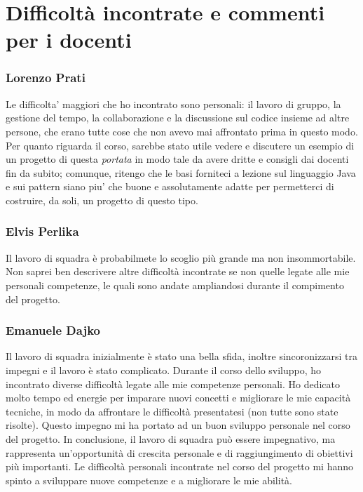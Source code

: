 \documentclass[a4paper,12pt]{report}
\begin{document}
\section{Difficoltà incontrate e commenti per i docenti}

\subsubsection{Lorenzo Prati}
Le difficolta' maggiori che ho incontrato sono personali: il lavoro di gruppo, la gestione del tempo, la collaborazione e la discussione sul codice insieme ad altre persone, che erano tutte cose che non avevo mai affrontato prima in questo modo. Per quanto riguarda il corso, sarebbe stato utile vedere e discutere un esempio di un progetto di questa \textit{portata} in modo tale da avere dritte e consigli dai docenti fin da subito; comunque, ritengo che le basi forniteci a lezione sul linguaggio Java e sui pattern siano piu' che buone e assolutamente adatte per permetterci di costruire, da soli, un progetto di questo tipo.

\subsubsection{Elvis Perlika}
Il lavoro di squadra è probabilmete lo scoglio più grande ma non insommortabile.
Non saprei ben descrivere altre difficoltà incontrate se non quelle legate 
alle mie personali competenze, le quali sono andate ampliandosi durante il compimento del progetto.

\subsubsection{Emanuele Dajko}
Il lavoro di squadra inizialmente è stato una bella sfida, inoltre sincoronizzarsi tra impegni e il lavoro è stato complicato.
Durante il corso dello sviluppo, ho incontrato diverse difficoltà legate alle mie competenze personali.
Ho dedicato molto tempo ed energie per imparare nuovi concetti e migliorare le mie capacità tecniche, in modo da affrontare le difficoltà presentatesi (non tutte sono state risolte).
Questo impegno mi ha portato ad un buon sviluppo personale nel corso del progetto.
In conclusione, il lavoro di squadra può essere impegnativo, ma rappresenta un'opportunità di crescita personale e di raggiungimento di obiettivi più importanti.
Le difficoltà personali incontrate nel corso del progetto mi hanno spinto a sviluppare nuove competenze e a migliorare le mie abilità.
\end{document}
